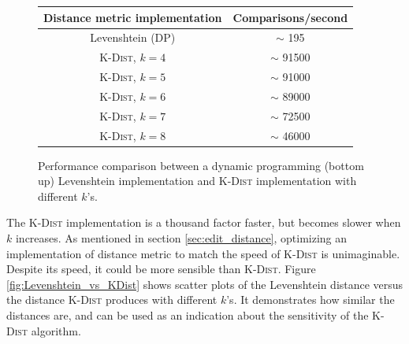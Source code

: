 \begin{figure}[H]   \centering   \begin{tabular}{ c | c }     Distance metric
implementation              & Comparisons/second      \\     \hline \hline
Levenshtein (DP)                      & $\sim$ 195              \\     \hline
\textsc{K-Dist}, $k=4$                & $\sim$ 91500            \\     \hline
\textsc{K-Dist}, $k=5$                & $\sim$ 91000            \\     \hline
\textsc{K-Dist}, $k=6$                & $\sim$ 89000            \\     \hline
\textsc{K-Dist}, $k=7$                & $\sim$ 72500            \\     \hline
\textsc{K-Dist}, $k=8$                & $\sim$ 46000            \\
\end{tabular}   \caption{Performance comparison between a dynamic programming
(bottom up) Levenshtein implementation and \textsc{K-Dist} implementation with
different $k$'s.}   \label{fig:levenshtein_vs_kdist_performance} \end{figure}
The \textsc{K-Dist} implementation is a thousand factor faster, but becomes
slower when $k$ increases. As mentioned in section \ref{sec:edit_distance},
optimizing an implementation of distance metric to match the speed of
\textsc{K-Dist} is unimaginable. Despite its speed, it could be more sensible
than \textsc{K-Dist}. Figure \ref{fig:Levenshtein_vs_KDist} shows scatter
plots of the Levenshtein distance versus the distance \textsc{K-Dist} produces
with different $k$'s. It demonstrates how similar the distances are, and can
be used as an indication about the sensitivity of the \textsc{K-Dist}
algorithm.


